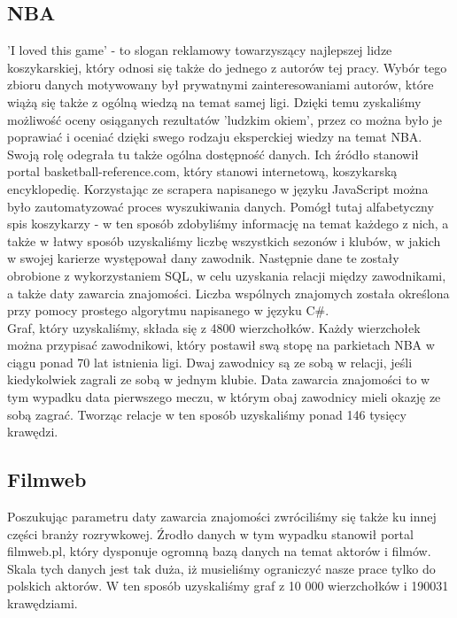 \documentclass{article}
\begin{document}
\subsection{NBA}
'I loved this game' - to slogan reklamowy towarzyszący najlepszej lidze koszykarskiej, który odnosi się także do jednego z autorów tej pracy. Wybór tego zbioru danych motywowany był prywatnymi zainteresowaniami autorów, które wiążą się także z ogólną wiedzą na temat samej ligi. Dzięki temu zyskaliśmy możliwość oceny osiąganych rezultatów 'ludzkim okiem', przez co można było je poprawiać i oceniać dzięki swego rodzaju eksperckiej wiedzy na temat NBA.\\

Swoją rolę odegrała tu także ogólna dostępność danych. Ich źródło stanowił portal basketball-reference.com, który stanowi internetową, koszykarską encyklopedię. Korzystając ze scrapera napisanego w języku JavaScript można było zautomatyzować proces wyszukiwania danych. Pomógł tutaj alfabetyczny spis koszykarzy - w ten sposób zdobyliśmy informację na temat każdego z nich, a także w łatwy sposób uzyskaliśmy liczbę wszystkich sezonów i klubów, w jakich w swojej karierze występował dany zawodnik. Następnie dane te zostały obrobione z wykorzystaniem SQL, w celu uzyskania relacji między zawodnikami, a także daty zawarcia znajomości. Liczba wspólnych znajomych została określona przy pomocy prostego algorytmu napisanego w języku C\#.\\

Graf, który uzyskaliśmy, składa się z 4800 wierzchołków. Każdy wierzchołek można przypisać zawodnikowi, który postawił swą stopę na parkietach NBA w ciągu ponad 70 lat istnienia ligi. Dwaj zawodnicy są ze sobą w relacji, jeśli kiedykolwiek zagrali ze sobą w jednym klubie. Data zawarcia znajomości to w tym wypadku data pierwszego meczu, w którym obaj zawodnicy mieli okazję ze sobą zagrać. Tworząc relacje w ten sposób uzyskaliśmy ponad 146 tysięcy krawędzi.

\subsection{Filmweb}
Poszukując parametru daty zawarcia znajomości zwróciliśmy się także ku innej części branży rozrywkowej. Źrodło danych w tym wypadku stanowił portal filmweb.pl, który dysponuje ogromną bazą danych na temat aktorów i filmów. Skala tych danych jest tak duża, iż musieliśmy ograniczyć nasze prace tylko do polskich aktorów. W ten sposób uzyskaliśmy graf z 10 000 wierzchołków i 190031 krawędziami.\\
\end{document}

